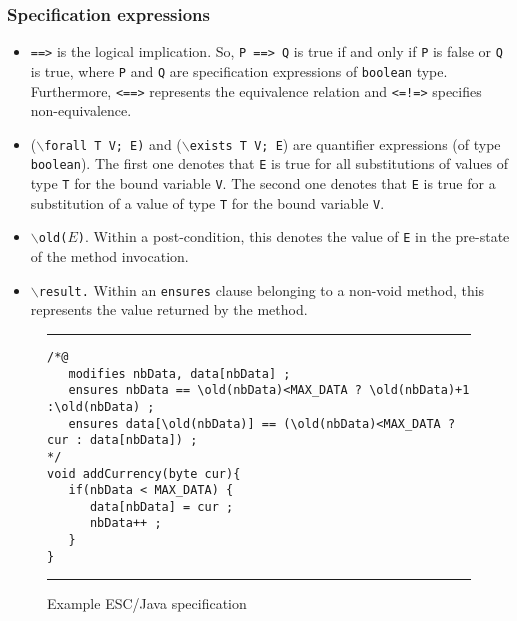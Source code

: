 \documentclass[a4paper]{llncs}
\begin{document}
\subsubsection{Specification expressions}
\begin{itemize}
\item{\texttt{==>}} is the logical implication. So, \texttt{P
==> Q} is true if and only if \texttt{P} is false or \texttt{Q} is
true, where \texttt{P} and \texttt{Q} are specification expressions of 
\texttt{boolean} type. Furthermore, \texttt{<==>} represents the
equivalence relation and \texttt{<=!=>} specifies non-equivalence.

\item {($\backslash$\texttt{forall T V; E)} and
($\backslash$\texttt{exists T V; E})} are quantifier expressions (of
type \texttt{boolean}).  The first one denotes that \texttt{E} is true
for all substitutions of values of type \texttt{T} for the bound
variable \texttt{V}. The second one denotes that \texttt{E} is true
for a substitution of a value of type \texttt{T} for the bound
variable \texttt{V}.

\item{\texttt{$\backslash$old($E$)}.} Within a post-condition, this denotes
the value of \texttt{E} in the pre-state of the method invocation. 

\item {\tt$\backslash$result.} Within an \texttt{ensures} clause
belonging to a non-void method, this represents the value returned by
the method.
\end{itemize}


\begin{figure}
\rule{\linewidth}{0.3mm}
\begin{verbatim}
/*@
   modifies nbData, data[nbData] ;
   ensures nbData == \old(nbData)<MAX_DATA ? \old(nbData)+1 :\old(nbData) ; 
   ensures data[\old(nbData)] == (\old(nbData)<MAX_DATA ? cur : data[nbData]) ;
*/
void addCurrency(byte cur){
   if(nbData < MAX_DATA) {
      data[nbData] = cur ;
      nbData++ ;
   }
}
\end{verbatim}
\caption{Example ESC/Java specification}
\label{fig-add-cur}
\rule{\linewidth}{0.3mm}
\end{figure}
\end{document}
